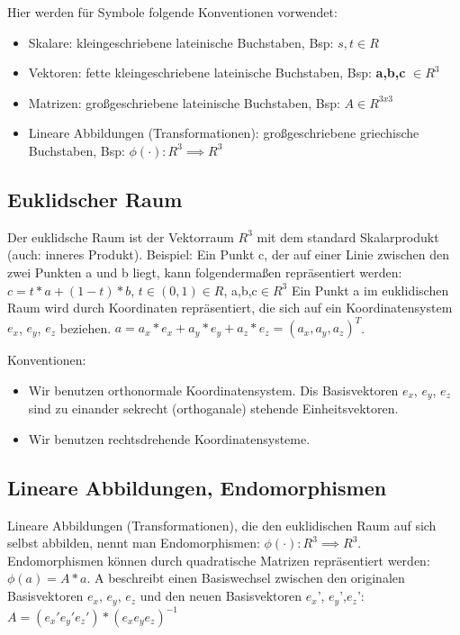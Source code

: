 \documentclass[paper=a4, fontsize=11pt]{scrartcl} %
\numberwithin{equation}{section} %
\numberwithin{figure}{section} %
\numberwithin{table}{section} %
\begin{document}
Hier werden für Symbole folgende Konventionen vorwendet:
\begin{itemize}
\item Skalare: kleingeschriebene lateinische Buchstaben, Bsp: $s, t \in R$
\item Vektoren: fette kleingeschriebene lateinische Buchstaben, Bsp: \textbf{a,b,c} $\in R^3$
\item Matrizen: großgeschriebene lateinische Buchstaben, Bsp: $A \in R^{3x3}$
\item Lineare Abbildungen (Transformationen): großgeschriebene griechische Buchstaben, Bsp: $\phi(\cdot): R^3 \implies R^3$
\end{itemize}

\subsection{Euklidscher Raum}

Der euklidsche Raum ist der Vektorraum $R^3$ mit dem standard Skalarprodukt (auch: inneres Produkt). Beispiel: Ein Punkt c, der auf einer Linie zwischen den zwei Punkten a und b liegt, kann folgendermaßen repräsentiert werden: $c = t * a + (1-t) * b$, $t \in (0,1) \in R$, a,b,c$ \in R^3$
Ein Punkt a im euklidischen Raum wird durch Koordinaten repräsentiert, die sich auf ein Koordinatensystem $e_x$, $e_y$, $e_z$ beziehen. $a = a_x * e_x + a_y * e_y + a_z * e_z = (a_x,a_y,a_z)^T$.

Konventionen:
\begin{itemize}
\item Wir benutzen orthonormale Koordinatensystem. Dis Basisvektoren $e_x$, $e_y$, $e_z$ sind zu einander sekrecht (orthoganale) stehende Einheitsvektoren.
\item Wir benutzen rechtsdrehende Koordinatensysteme.
\end{itemize}

\subsection{Lineare Abbildungen, Endomorphismen}

Lineare Abbildungen (Transformationen), die den euklidischen Raum auf sich selbst abbilden, nennt man Endomorphismen: $\phi(\cdot): R^3 \implies R^3$.
Endomorphismen können durch quadratische Matrizen repräsentiert werden: $\phi(a) = A * a$.
A beschreibt einen  Basiswechsel zwischen den originalen Basisvektoren $e_x$, $e_y$, $e_z$ und den neuen Basisvektoren $e_x$', $e_y$',$e_z$': $A = (e_x' e_y' e_z') * (e_x e_y e_z)^{-1}$
\end{document}
